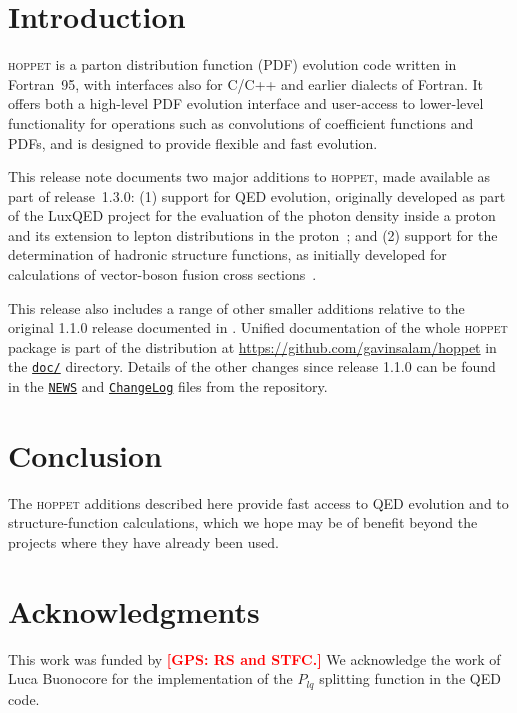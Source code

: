 \documentclass[preprint,1p,a4paper,11pt]{elsarticle}
\newcommand{\hoppet}{\textsc{hoppet}\xspace}
\newcommand{\ttt}[1]{\texttt{#1}}
\newcommand{\masterlink}[1]{\href{https://github.com/gavinsalam/hoppet/blob/master/#1}{\ttt{#1}}}
\newcommand{\comment}[1]{\textcolor{red}{{\bf [#1]}}}
\begin{document}
\section{Introduction}

\hoppet is a parton distribution function (PDF) evolution code written
in Fortran~95, with interfaces also for C/C++ and earlier dialects of
Fortran.
%
It offers both a high-level PDF evolution interface and user-access to
lower-level functionality for operations such as convolutions of
coefficient functions and PDFs, and is designed to provide flexible and
fast evolution.

This release note documents two major additions to \hoppet, made
available as part of release~1.3.0: (1) support for QED evolution,
originally developed as part of the LuxQED project for the evaluation
of the photon density inside a proton and its extension to lepton
distributions in the
proton~\cite{Manohar:2016nzj,Manohar:2017eqh,Buonocore:2020nai,Buonocore:2021bsf};
%
and (2) support for the
determination of hadronic structure functions, as initially developed
for calculations of vector-boson fusion cross
sections~\cite{Cacciari:2015jma,Dreyer:2016oyx,Dreyer:2018qbw,Dreyer:2018rfu}.

This release also includes a range of other smaller additions relative
to the original 1.1.0 release documented in
\cite{Salam:2008qg}.
%
Unified documentation of the whole \hoppet package is part of the
distribution at \url{https://github.com/gavinsalam/hoppet} in the
\masterlink{doc/} directory.
%
Details of the other changes since release 1.1.0 can be found in the
\masterlink{NEWS} and \masterlink{ChangeLog} files from the
repository.





\section{Conclusion}

The \hoppet additions described here provide fast access to QED
evolution and to structure-function calculations, which we hope may be
of benefit beyond the projects where they have already been used.


\section*{Acknowledgments}
This work was funded by
%
\comment{GPS: RS and STFC.}
We acknowledge the work of Luca Buonocore
for the implementation of the $P_{lq}$ splitting function in the QED code.
% 




%
\end{document}
